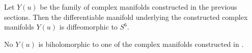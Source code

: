 \begin{thm}\label{thm: main} Let $Y(u)$ be the family of complex manifolds constructed in the previous sections. 
	Then the differentiable manifold underlying the constructed complex manifolds $Y(u)$ is diffeomorphic to $S^6$. 
	
	No $Y(u)$ is biholomorphic to one of the  complex manifolds constructed in \cite{Engel2026, Alpoge2026}.
\end{thm}